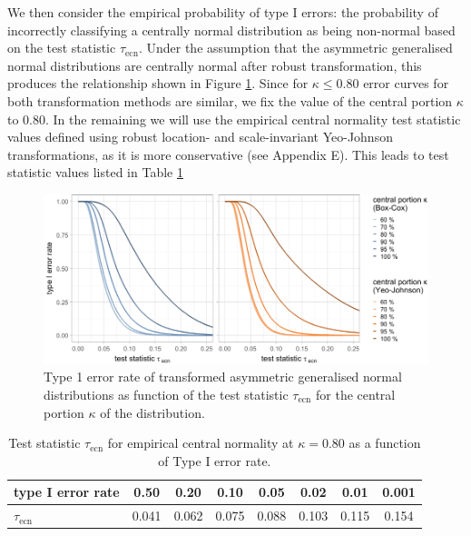 \documentclass[
  a4paper,
]{article}
\begin{document}
We then consider the empirical probability of type I errors: the
probability of incorrectly classifying a centrally normal distribution
as being non-normal based on the test statistic \(\tau_{\text{ecn}}\).
Under the assumption that the asymmetric generalised normal
distributions are centrally normal after robust transformation, this
produces the relationship shown in Figure
\ref{fig:empirical-central-normality-type-1-error-rate}. Since for
\(\kappa \leq 0.80\) error curves for both transformation methods are
similar, we fix the value of the central portion \(\kappa\) to 0.80. In
the remaining we will use the empirical central normality test statistic
values defined using robust location- and scale-invariant Yeo-Johnson
transformations, as it is more conservative (see Appendix E). This leads
to test statistic values listed in Table
\ref{tab:empirical-central-normality}

\begin{figure}

{\centering \includegraphics{manuscript_files/figure-latex/empirical-central-normality-type-1-error-rate-1} 

}

\caption{Type 1 error rate of transformed asymmetric generalised normal distributions as function of the test statistic $\tau_{\text{ecn}}$ for the central portion $\kappa$ of the distribution.}\label{fig:empirical-central-normality-type-1-error-rate}
\end{figure}

\begin{table}
\begin{center}
\caption{Test statistic $\tau_{\text{ecn}}$ for empirical central normality at $\kappa = 0.80$ as a function of Type I error rate.}
\label{tab:empirical-central-normality}
\begin{tabular}{l | c c c c c c c}

\toprule
type I error rate & 0.50 & 0.20 & 0.10 & 0.05 & 0.02 & 0.01 & 0.001 \\

\midrule
$\tau_{\text{ecn}}$ & 0.041 & 0.062 & 0.075 & 0.088 & 0.103 & 0.115 & 0.154 \\
\bottomrule
\end{tabular}
\end{center}
\end{table}
\end{document}
